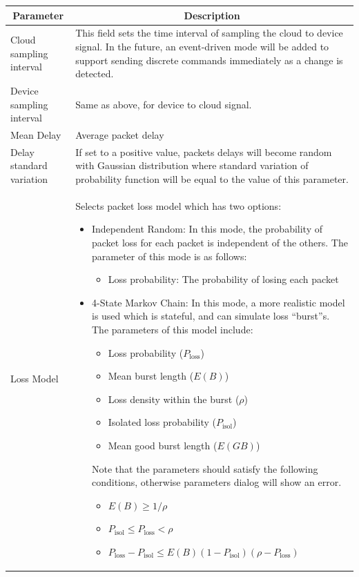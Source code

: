 \documentclass[a4paper, 11pt]{article}
\begin{document}
\begin{enumerate}
\begin{longtable}{l|p{12cm}}
\multicolumn{1}{c|}{Parameter} & \multicolumn{1}{c}{Description} \\
\hline
Cloud sampling interval & This field sets the time interval of sampling the cloud to device signal. In the future, an event-driven mode will be added to support sending discrete commands immediately as a change is detected. \\ \hline
Device sampling interval & Same as above, for device to cloud signal. \\ \hline
Mean Delay & Average packet delay \\ \hline
Delay standard variation & If set to a positive value, packets delays will become random with Gaussian distribution where standard variation of probability function will be equal to the value of this parameter. \\ \hline 
Loss Model & Selects packet loss model which has two options:
\begin{itemize}
\item Independent Random: In this mode, the probability of packet loss for each packet is independent of the others. The parameter of this mode is as follows:
\begin{itemize}
\item Loss probability: The probability of losing each packet
\end{itemize}
\item 4-State Markov Chain: In this mode, a more realistic model is used which is stateful, and can simulate loss ``burst''s. The parameters of this model include:
\begin{itemize}
\item Loss probability ($P_\textrm{loss}$)
\item Mean burst length ($E(B)$)
\item Loss density within the burst ($\rho$)
\item Isolated loss probability ($P_\textrm{isol}$)
\item Mean good burst length ($E(GB)$)
\end{itemize}
Note that the parameters should satisfy the following conditions, otherwise parameters dialog will show an error.
\begin{itemize}
\item $E(B) \ge 1/\rho$
\item $P_\textrm{isol} \le P_\textrm{loss} < \rho$
\item $P_\textrm{loss} - P_\textrm{isol} \le E(B) (1-P_\textrm{isol})(\rho - P_\textrm{loss})$

\end{itemize}
\end{itemize}
\end{longtable}
\end{enumerate}
\end{document}
